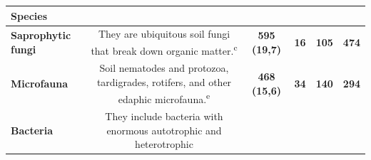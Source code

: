 \documentclass[10pt,oneside]{article}
\begin{document}
\begin{longtable}[]{@{}lccccc@{}}
\begin{minipage}[b]{0.04\columnwidth}
Species\strut
\end{minipage}\tabularnewline
\midrule
\endhead
\begin{minipage}[t]{0.11\columnwidth}\raggedright
\textbf{Saprophytic fungi}\strut
\end{minipage} & \begin{minipage}[t]{0.45\columnwidth}\centering
They are ubiquitous soil fungi that break down organic
matter.\textsuperscript{c}\strut
\end{minipage} & \begin{minipage}[t]{0.14\columnwidth}\centering
\textbf{595 (19,7)}\strut
\end{minipage} & \begin{minipage}[t]{0.04\columnwidth}\centering
\textbf{16}\strut
\end{minipage} & \begin{minipage}[t]{0.04\columnwidth}\centering
\textbf{105}\strut
\end{minipage} & \begin{minipage}[t]{0.04\columnwidth}\centering
\textbf{474}\strut
\end{minipage}\tabularnewline
\begin{minipage}[t]{0.11\columnwidth}\raggedright
\textbf{Microfauna}\strut
\end{minipage} & \begin{minipage}[t]{0.45\columnwidth}\centering
Soil nematodes and protozoa, tardigrades, rotifers, and other edaphic
microfauna.\textsuperscript{e}\strut
\end{minipage} & \begin{minipage}[t]{0.14\columnwidth}\centering
\textbf{468 (15,6)}\strut
\end{minipage} & \begin{minipage}[t]{0.04\columnwidth}\centering
\textbf{34}\strut
\end{minipage} & \begin{minipage}[t]{0.04\columnwidth}\centering
\textbf{140}\strut
\end{minipage} & \begin{minipage}[t]{0.04\columnwidth}\centering
\textbf{294}\strut
\end{minipage}\tabularnewline
\begin{minipage}[t]{0.11\columnwidth}\raggedright
\textbf{Bacteria}\strut
\end{minipage} & \begin{minipage}[t]{0.45\columnwidth}\centering
They include bacteria with enormous autotrophic and heterotrophic

\end{minipage}
\end{longtable}
\end{document}
